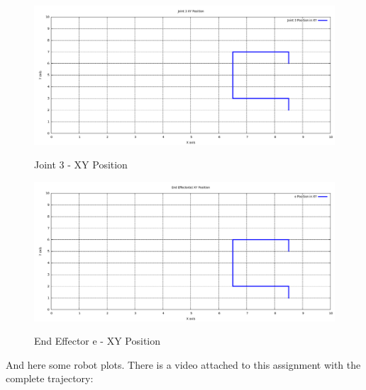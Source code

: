 \documentclass[10pt,a4paper]{article}
\begin{document}
	\begin{figure}[H]
	\includegraphics[angle = 0, scale = 0.3]{figures/Q1Joint3Pos.png} 
	\label{fig:Q1Joint3Pos}
	\caption{ Joint 3 - XY Position}
	\end{figure}
	
    \begin{figure}[H]
	\includegraphics[angle = 0, scale = 0.3]{figures/Q1EEPos.png} 
	\label{fig:Q1EEPos}
	\caption{ End Effector e - XY Position}
	\end{figure}


And here some robot plots. There is a video attached to this assignment with the complete trajectory:
\end{document}
